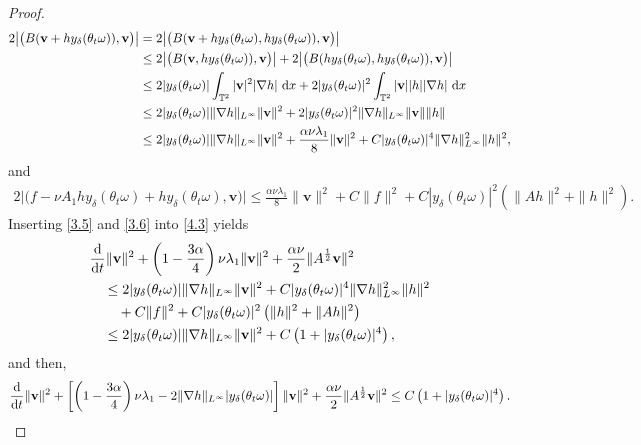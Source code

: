 \documentclass{elsarticle}
\theoremstyle{definition}
\numberwithin{equation}{section}
\newcommand{\ee}{\end{aligned}\end{equation}}
\newcommand{\ben}{\begin{equation}\nonumber\begin{aligned}}
\renewcommand{\d}{{\rm{d}}}
\begin{document}
\begin{proof}
\begin{align}\label{3.5}
   2\big | \big(B(\textbf{v}+hy_\delta(\theta_t\omega)) ,\textbf{v} \big) \big|
  &= 2\big | \big(B(\textbf{v}+hy_\delta(\theta_t\omega),hy_\delta(\theta_t\omega)) ,\textbf{v} \big) \big| \nonumber\\
   & \leq  2 \big | \big(B(\textbf{v},hy_\delta(\theta_t\omega)),\textbf{v} \big) \big| +2 \big| \big (B(hy_\delta(\theta_t\omega),hy_\delta(\theta_t\omega)),\textbf{v} \big) \big| \nonumber\\
&\leq 2 |y_\delta(\theta_t\omega)|\int_{\mathbb{T}^2}|\textbf{v}|^2|\nabla h|\ \d x+ 2|y_\delta(\theta_t\omega)|^2\int_{\mathbb{T}^2}|\textbf{v}||h||\nabla h|\ \d x\nonumber\\
&\leq 2 |y_\delta(\theta_t\omega)|\|\nabla h\|_{L^\infty}\|\textbf{v}\|^2+ 2|y_\delta(\theta_t\omega)|^2\|\nabla h\|_{L^\infty}\|\textbf{v}\|\|h\|\nonumber\\
&\leq 2 |y_\delta(\theta_t\omega)|\|\nabla h\|_{L^\infty}\|\textbf{v}\|^2+  \frac{ \alpha\nu \lambda_1} {8} \|\textbf{v}\|^2+ C|y_\delta(\theta_t\omega)|^4\|\nabla h\|_{L^\infty}^2\|h\|^2 ,
\end{align}
and
\begin{align}\label{3.6}
 2\big| \big (f-\nu A_1hy_\delta(\theta_t\omega) +hy_\delta(\theta_t\omega),\textbf{v} \big)\big|  \leq \frac{ \alpha\nu \lambda_1}{8}\|\textbf{v}\|^2+C\|f\|^2
 + C|y_\delta(\theta_t\omega)|^2 \left(\|Ah\|^2 + \|h\|^2\right) .
\end{align}
Inserting \eqref{3.5}  and \eqref{3.6} into \eqref{4.3} yields
\ben
&
\frac{\d}{\d t}\|\textbf{v}\|^2+ \left(1-\frac {3 \alpha} 4\right) \nu \lambda_1  \| \textbf{v}\|^2  + \frac {\alpha \nu }  2 \|A^{\frac12}\textbf{v}\|^2  \\
 &\quad \leq 2|y_\delta(\theta_t\omega)|\|\nabla h\|_{L^\infty}\|\textbf{v}\|^2+ C |y_\delta(\theta_t\omega)|^4\|\nabla h\|_{L^\infty}^2\|h\|^2\nonumber\\
&\qquad + C\|f\|^2+ C |y_\delta(\theta_t\omega)|^2 \left (\|h\|^2+\|Ah\|^2 \right)\nonumber\\
&\quad \leq 2|y_\delta(\theta_t\omega)|\|\nabla h\|_{L^\infty}\|\textbf{v}\|^2+C \left (1+|y_\delta(\theta_t\omega)|^4 \right),
\ee
and then,
\begin{align*}
\frac{\d}{\d t}\|\textbf{v}\|^2+ \left[ \left(1-\frac{3\alpha} 4\right ) \nu \lambda_1 -2\|\nabla h\|_{L^\infty}|y_\delta(\theta_t\omega)| \right ]
\|\textbf{v}\|^2+\frac{ \alpha \nu } 2\|A^{\frac12}\textbf{v}\|^2
\leq C  \left (1+|y_\delta(\theta_t\omega)|^4 \right)  .

\end{align*}
\end{proof}
\end{document}

